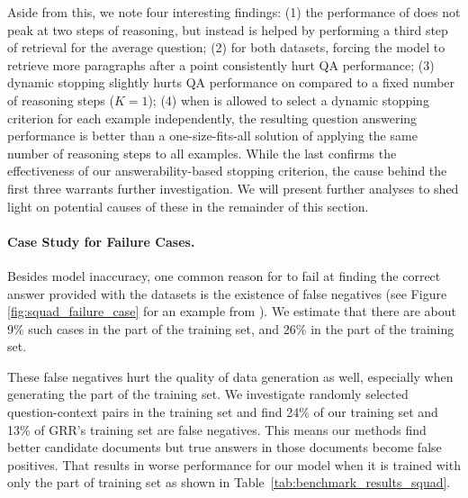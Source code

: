 Aside from this, we note four interesting findings: (1) the performance of \hotpotqa{} does not peak at two steps of reasoning, but instead is helped by performing a third step of retrieval for the average question; (2) for both datasets, forcing the model to retrieve more paragraphs after a point consistently hurt QA performance; (3) dynamic stopping slightly hurts QA performance on \squadopen{} compared to a fixed number of reasoning steps ($K=1$); (4) when \irrr{} is allowed to select a dynamic stopping criterion for each example independently, the resulting question answering performance is better than a one-size-fits-all solution of applying the same number of reasoning steps to all examples.
While the last confirms the effectiveness of our answerability-based stopping criterion, the cause behind the first three warrants further investigation.
We will present further analyses to shed light on potential causes of these in the remainder of this section.

\paragraph{Case Study for Failure Cases.} \label{failure_cases}

Besides model inaccuracy, one common reason for \irrr{} to fail at finding the correct answer provided with the datasets is the existence of false negatives (see Figure \ref{fig:squad_failure_case} for an example from \squadopen{}).
We estimate that there are about 9\% such cases in the \hotpotqa{} part of the training set, and 26\% in the \squad{} part of the training set.

These false negatives hurt the quality of data generation as well, especially when generating the \squad{} part of the training set. We investigate randomly selected question-context pairs in the training set and find 24\% of our \squad{} training set and 13\% of GRR's \squad{} training set are false negatives. This means our methods find better candidate documents but true answers in those documents become false positives. That results in worse performance for our model when it is trained with only the \squad{} part of training set as shown in Table~\ref{tab:benchmark_results_squad}. 


